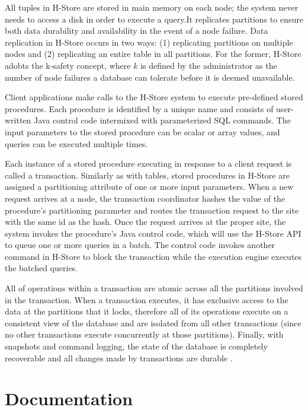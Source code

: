 \documentclass[9pt,twocolumn,twoside]{../../styles/osajnl}
\begin{document}
All tuples in H-Store are stored in main memory on each node; the system never needs to access a disk in order to execute a query.It replicates partitions to ensure both data durability and availability in the event of a node failure. Data replication in H-Store occurs in two ways: (1) replicating partitions on multiple nodes and (2) replicating an entire table in all partitions. For the former, H-Store adobts the k-safety concept, where $k$ is defined by the administrator as the number of node failures a database can tolerate before it is deemed unavailable.

Client applications make calls to the H-Store system to execute pre-defined stored procedures. Each procedure is identified by a unique name and consists of user-written Java control code intermixed with parameterized SQL commands. The input parameters to the stored procedure can be scalar or array values, and queries can be executed multiple times.

Each instance of a stored procedure executing in response to a client request is called a transaction. Similarly as with tables, stored procedures in H-Store are assigned a partitioning attribute of one or more input parameters. When a new request arrives at a node, the transaction coordinator hashes the value of the procedure’s partitioning parameter and routes the transaction request to the site with the same id as the hash. Once the request arrives at the proper site, the system invokes the procedure’s Java control code, which will use the H-Store API to queue one or more queries in a batch. The control code invokes another command in H-Store to block the transaction while the execution engine executes the batched queries.

All of operations within a transaction are atomic across all the partitions involved in the transaction. When a transaction executes, it has exclusive access to the data at the partitions that it locks, therefore all of its operations execute on a consistent view of the database and are isolated from all other transactions (since no other transactions execute concurrently at those partitions). Finally, with snapshots and command logging, the state of the database is completely recoverable and all changes made by transactions are durable \cite{kallman2008} \cite{www-H-StoreArch}.

\section{Documentation}
\end{document}
